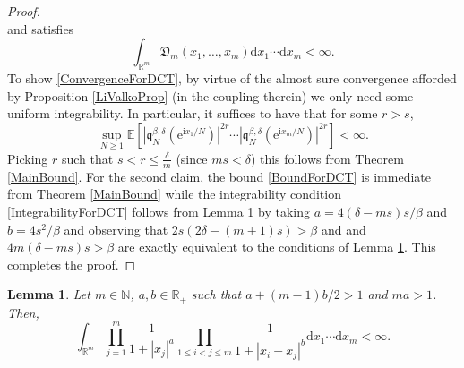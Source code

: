 \documentclass[]{article}
\newtheorem{lem}[thm]{Lemma}
\begin{document}
\begin{proof}
\begin{equation*}
\end{equation*}
and satisfies
\begin{equation}\label{IntegrabilityForDCT}
\int_{\mathbb{R}^m}\mathfrak{D}_m(x_1,\dots,x_m)\mathrm{d}x_1\cdots\mathrm{d}x_m<\infty.
\end{equation}
To show \eqref{ConvergenceForDCT}, by virtue of the almost sure convergence afforded by Proposition \ref{LiValkoProp} (in the coupling therein) we only need some uniform integrability. In particular, it suffices to have that for some $r>s$,
\begin{equation*}
\sup_{N\ge 1} \mathbb{E}\left[\left|\mathfrak{q}_N^{\beta,\delta}(\mathrm{e}^{\mathrm{i}x_1/N})\right|^{2r}\cdots \left|\mathfrak{q}_N^{\beta,\delta}(\mathrm{e}^{\mathrm{i}x_m/N})\right|^{2r}\right]<\infty.
\end{equation*}
Picking $r$ such that $s<r\le\frac{\delta}{m}$ (since $ms<\delta$) this follows from Theorem \ref{MainBound}. For the second claim, the bound \eqref{BoundForDCT} is immediate from Theorem \ref{MainBound} while the integrability condition \eqref{IntegrabilityForDCT} follows from Lemma \ref{IntegralFinite} by taking $a=4(\delta-ms)s/\beta$ and $b=4s^2/\beta$ and observing that  $2s(2\delta-(m+1)s)>\beta$ and and $4m(\delta-m s)s>\beta$ are exactly equivalent to the conditions of Lemma \ref{IntegralFinite}. This completes the proof. 
\end{proof}


\begin{lem}\label{IntegralFinite}
Let $m\in \mathbb{N}$, $a,b \in \mathbb{R}_+$ such that $a+(m-1)b/2>1$ and $ma>1$. Then,
\begin{equation*}
\int_{\mathbb{R}^m}\prod_{j=1}^m\frac{1}{1+|x_j|^a}\prod_{1\le i< j \le m}\frac{1}{1+|x_i-x_j|^b}\mathrm{d}x_1\cdots\mathrm{d}x_m<\infty.
\end{equation*}
\end{lem}
\end{document}
